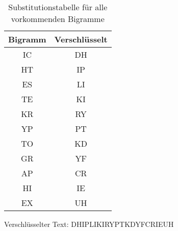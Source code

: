 \documentclass[DIN, pagenumber=false, fontsize=11pt, parskip=half]{scrartcl}
\begin{document}
    \begin{table}[H]
        \centering
        \begin{tabular}{cc}
            \toprule
            Bigramm & Verschlüsselt \\
            \midrule
            IC & DH \\
            HT & IP \\
            ES & LI \\
            TE & KI \\
            KR & RY \\
            YP & PT \\ 
            TO & KD \\
            GR & YF \\
            AP & CR \\
            HI & IE \\
            EX & UH \\
            \bottomrule
        \end{tabular}
        \caption{Substitutionstabelle für alle vorkommenden Bigramme}
    \end{table}

    Verschlüsselter Text: \glqq{}DHIPLIKIRYPTKDYFCRIEUH\grqq{}
\end{document}
